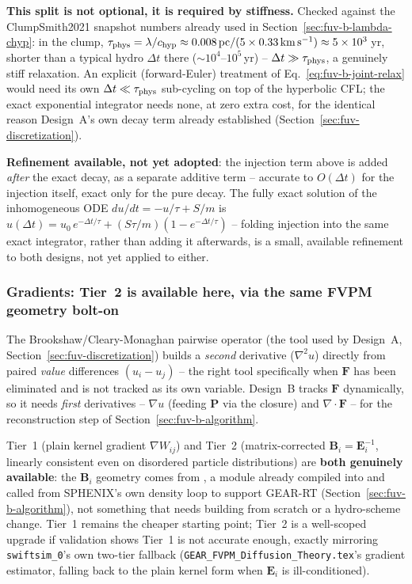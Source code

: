 \textbf{This split is not optional, it is required by stiffness.}
Checked against the ClumpSmith2021 snapshot numbers already used in
Section~\ref{sec:fuv-b-lambda-chyp}: in the clump,
$\tau_{\rm phys}=\lambda/c_{\rm hyp}\approx0.008\,{\rm
pc}/(5\times0.33\,{\rm km\,s^{-1}})\approx5\times10^3\,$yr, shorter
than a typical hydro $\Delta t$ there ($\sim10^4$--$10^5\,$yr) --
$\Delta t\gg\tau_{\rm phys}$, a genuinely stiff relaxation. An explicit
(forward-Euler) treatment of Eq.~\ref{eq:fuv-b-joint-relax} would need
its own $\Delta t\ll\tau_{\rm phys}$ sub-cycling on top of the
hyperbolic CFL; the exact exponential integrator needs none, at zero
extra cost, for the identical reason Design~A's own decay term already
established (Section~\ref{sec:fuv-discretization}).

\textbf{Refinement available, not yet adopted}: the injection term
above is added \emph{after} the exact decay, as a separate additive
term -- accurate to $O(\Delta t)$ for the injection itself, exact only
for the pure decay. The fully exact solution of the inhomogeneous ODE
$du/dt=-u/\tau+S/m$ is $u(\Delta t)=u_0\,e^{-\Delta t/\tau}+(S\tau/m)
(1-e^{-\Delta t/\tau})$ -- folding injection into the same exact
integrator, rather than adding it afterwards, is a small, available
refinement to both designs, not yet applied to either.

\subsubsection{Gradients: Tier~2 is available here, via the same FVPM
geometry bolt-on}
\label{sec:fuv-b-gradients}

The Brookshaw/Cleary-Monaghan pairwise operator (the tool used by
Design~A, Section~\ref{sec:fuv-discretization}) builds a \emph{second}
derivative ($\nabla^2u$) directly from paired \emph{value} differences
$(u_i-u_j)$ -- the right tool specifically when $\mathbf F$ has been
eliminated and is not tracked as its own variable. Design~B tracks
$\mathbf F$ dynamically, so it needs \emph{first} derivatives -- $\nabla
u$ (feeding $\mathbf P$ via the closure) and $\nabla\cdot\mathbf F$ --
for the reconstruction step of Section~\ref{sec:fuv-b-algorithm}.

Tier~1 (plain kernel gradient $\nabla W_{ij}$) and Tier~2
(matrix-corrected $\mathbf B_i=\mathbf E_i^{-1}$, linearly consistent
even on disordered particle distributions) are \textbf{both genuinely
available}: the $\mathbf B_i$ geometry comes from
, a module already compiled into and
called from SPHENIX's own density loop to support GEAR-RT
(Section~\ref{sec:fuv-b-algorithm}), not something that needs building
from scratch or a hydro-scheme change. Tier~1 remains the cheaper
starting point; Tier~2 is a well-scoped upgrade if validation shows
Tier~1 is not accurate enough, exactly mirroring
\texttt{swiftsim\_0}'s own two-tier fallback
(\texttt{GEAR\_FVPM\_Diffusion\_Theory.tex}'s gradient estimator,
falling back to the plain kernel form when $\mathbf E_i$ is
ill-conditioned).

